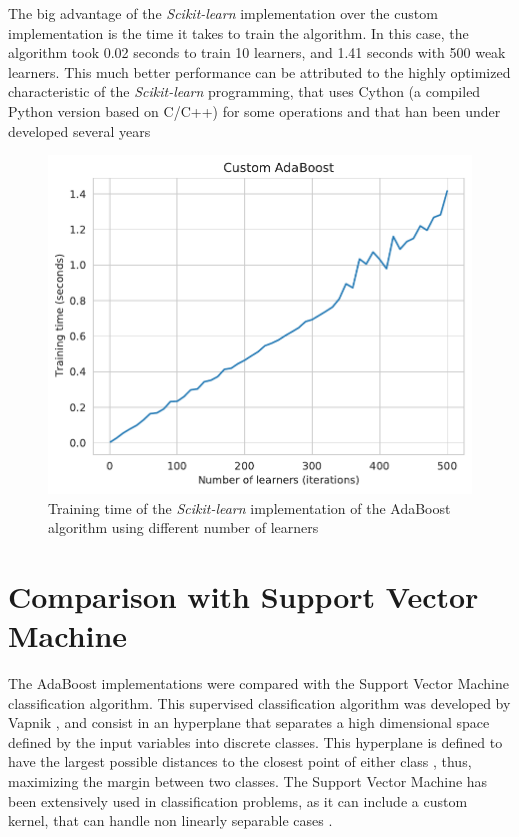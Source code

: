 \documentclass[11pt,twocolumn,letterpaper]{article}
\begin{document}
The big advantage of the \textit{Scikit-learn} implementation over the custom implementation is the time it takes to train the algorithm. In this case, the algorithm took 0.02 seconds to train 10 learners, and 1.41 seconds with 500 weak learners. This much better performance can be attributed to the highly optimized characteristic of the \textit{Scikit-learn} programming, that uses Cython (a compiled Python version based on C/C++) for some operations and that han been under developed several years

\begin{figure}[h]
	\begin{center}
		\includegraphics[width=1.0\linewidth]{train_time_sklearn.pdf}
		\caption{Training time of the \textit{Scikit-learn} implementation of the AdaBoost algorithm using different number of learners}
		\label{fig:time_sklearn}
	\end{center}
\end{figure}

\section{Comparison with Support Vector Machine}

The AdaBoost implementations were compared with the Support Vector Machine classification algorithm. This supervised classification algorithm was developed by Vapnik \cite{Vapnik1995}, and consist in an hyperplane that separates a high dimensional space defined by the input variables into discrete classes. This hyperplane is defined to have the largest possible distances to the closest point of either class , thus, maximizing the margin between two classes. The Support Vector Machine has been extensively used in classification problems, as it can include a custom kernel, that can handle non linearly separable cases \cite{Hastie2009}.
\end{document}
